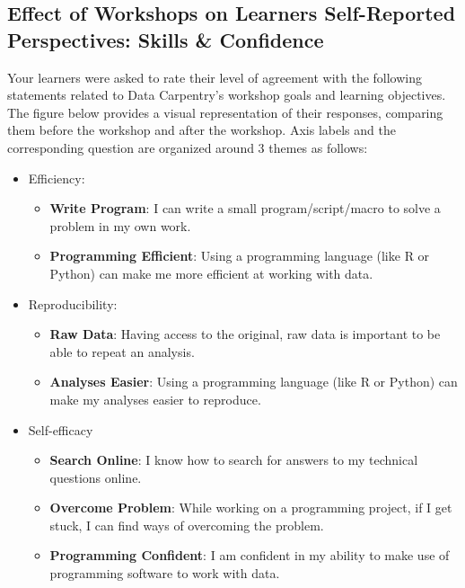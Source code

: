 \documentclass[]{article}
\providecommand{\tightlist}{%
  \setlength{\itemsep}{0pt}\setlength{\parskip}{0pt}}
\begin{document}
\subsection{Effect of Workshops on Learners Self-Reported Perspectives:
Skills \&
Confidence}\label{effect-of-workshops-on-learners-self-reported-perspectives-skills-confidence}

Your learners were asked to rate their level of agreement with the
following statements related to Data Carpentry's workshop goals and
learning objectives. The figure below provides a visual representation
of their responses, comparing them before the workshop and after the
workshop. Axis labels and the corresponding question are organized
around 3 themes as follows:

\begin{itemize}
\tightlist
\item
  Efficiency:

  \begin{itemize}
  \tightlist
  \item
    \textbf{Write Program}: I can write a small program/script/macro to
    solve a problem in my own work.
  \item
    \textbf{Programming Efficient}: Using a programming language (like R
    or Python) can make me more efficient at working with data.
  \end{itemize}
\item
  Reproducibility:

  \begin{itemize}
  \tightlist
  \item
    \textbf{Raw Data}: Having access to the original, raw data is
    important to be able to repeat an analysis.
  \item
    \textbf{Analyses Easier}: Using a programming language (like R or
    Python) can make my analyses easier to reproduce.
  \end{itemize}
\item
  Self-efficacy

  \begin{itemize}
  \tightlist
  \item
    \textbf{Search Online}: I know how to search for answers to my
    technical questions online.
  \item
    \textbf{Overcome Problem}: While working on a programming project,
    if I get stuck, I can find ways of overcoming the problem.
  \item
    \textbf{Programming Confident}: I am confident in my ability to make
    use of programming software to work with data.
  \end{itemize}
\end{itemize}
\end{document}
